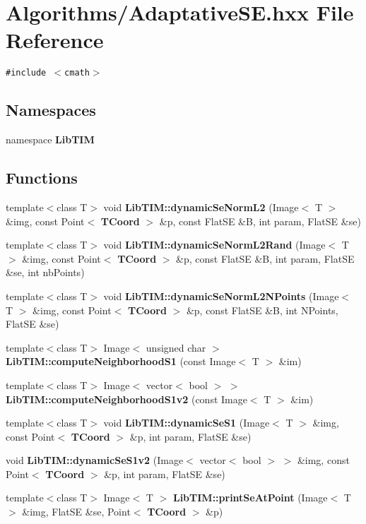 \section{Algorithms/Adaptative\-SE.hxx File Reference}
\label{AdaptativeSE_8hxx}
{\tt \#include $<$cmath$>$}\par
\subsection*{Namespaces}
\begin{CompactItemize}
\item 
namespace {\bf Lib\-TIM}
\end{CompactItemize}
\subsection*{Functions}
\begin{CompactItemize}
\item 
template$<$class T$>$ void {\bf Lib\-TIM::dynamic\-Se\-Norm\-L2} (Image$<$ T $>$ \&img, const Point$<$ {\bf TCoord} $>$ \&p, const Flat\-SE \&B, int param, Flat\-SE \&se)
\item 
template$<$class T$>$ void {\bf Lib\-TIM::dynamic\-Se\-Norm\-L2Rand} (Image$<$ T $>$ \&img, const Point$<$ {\bf TCoord} $>$ \&p, const Flat\-SE \&B, int param, Flat\-SE \&se, int nb\-Points)
\item 
template$<$class T$>$ void {\bf Lib\-TIM::dynamic\-Se\-Norm\-L2NPoints} (Image$<$ T $>$ \&img, const Point$<$ {\bf TCoord} $>$ \&p, const Flat\-SE \&B, int NPoints, Flat\-SE \&se)
\item 
template$<$class T$>$ Image$<$ unsigned char $>$ {\bf Lib\-TIM::compute\-Neighborhood\-S1} (const Image$<$ T $>$ \&im)
\item 
template$<$class T$>$ Image$<$ vector$<$ bool $>$ $>$ {\bf Lib\-TIM::compute\-Neighborhood\-S1v2} (const Image$<$ T $>$ \&im)
\item 
template$<$class T$>$ void {\bf Lib\-TIM::dynamic\-Se\-S1} (Image$<$ T $>$ \&img, const Point$<$ {\bf TCoord} $>$ \&p, int param, Flat\-SE \&se)
\item 
void {\bf Lib\-TIM::dynamic\-Se\-S1v2} (Image$<$ vector$<$ bool $>$ $>$ \&img, const Point$<$ {\bf TCoord} $>$ \&p, int param, Flat\-SE \&se)
\item 
template$<$class T$>$ Image$<$ T $>$ {\bf Lib\-TIM::print\-Se\-At\-Point} (Image$<$ T $>$ \&img, Flat\-SE \&se, Point$<$ {\bf TCoord} $>$ \&p)
\end{CompactItemize}
